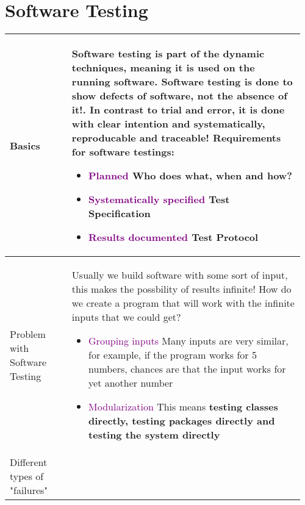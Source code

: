 \documentclass[main.tex,fontsize=8pt,paper=a4,paper=portrait,DIV=calc,]{scrartcl}
\begin{document}
\begin{table}[ht!]
\section{Software Testing}
\begin{tabular}{|m{0.2\linewidth}|m{0.755\linewidth}|}
\hline
Basics & 
Software testing is part of the \textbf{dynamic techniques}, meaning it is used on the running software.\newline
Software testing is done to \textbf{show defects of software, not the absence of it!}.\newline
In contrast to trial and error, it is \textbf{done with clear intention and systematically, reproducable and traceable!}\newline
Requirements for software testings:\newline
\begin{itemize}
\item \textcolor{purple}{Planned} \newline
  Who does what, when and how?
\item \textcolor{purple}{Systematically specified}\newline
  \textbf{Test Specification}
\item \textcolor{purple}{Results documented} \newline
  \textbf{Test Protocol}
\vspace{-3mm}
\end{itemize} \\
\hline
Problem with Software Testing & 
Usually we build software with some sort of input, this makes the possbility of results infinite! \newline
How do we create a program that will work with the infinite inputs that we could get?
\begin{itemize}
\item \textcolor{purple}{Grouping inputs}\newline
  Many inputs are very similar, for example, if the program works for 5 numbers,\newline
  chances are that the input works for yet another number
\item \textcolor{purple}{Modularization}\newline
  This means \textbf{testing classes directly, testing packages directly and testing the system directly}
\vspace{-3mm}
\end{itemize}\\ 
\hline
Different types of "failures" &

\end{tabular}
\end{table}
\end{document}
